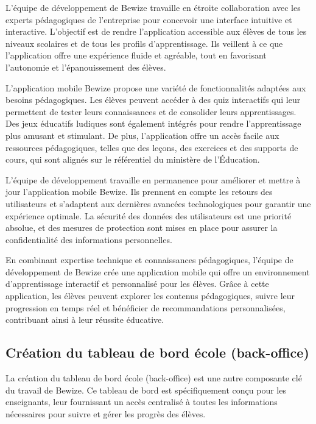     L'équipe de développement de Bewize travaille en étroite collaboration avec les experts pédagogiques de l'entreprise pour concevoir une interface intuitive et interactive. L'objectif est de rendre l'application accessible aux élèves de tous les niveaux scolaires et de tous les profils d'apprentissage. Ils veillent à ce que l'application offre une expérience fluide et agréable, tout en favorisant l'autonomie et l'épanouissement des élèves.
    
    L'application mobile Bewize propose une variété de fonctionnalités adaptées aux besoins pédagogiques. Les élèves peuvent accéder à des quiz interactifs qui leur permettent de tester leurs connaissances et de consolider leurs apprentissages. Des jeux éducatifs ludiques sont également intégrés pour rendre l'apprentissage plus amusant et stimulant. De plus, l'application offre un accès facile aux ressources pédagogiques, telles que des leçons, des exercices et des supports de cours, qui sont alignés sur le référentiel du ministère de l'Éducation.
    
    L'équipe de développement travaille en permanence pour améliorer et mettre à jour l'application mobile Bewize. Ils prennent en compte les retours des utilisateurs et s'adaptent aux dernières avancées technologiques pour garantir une expérience optimale. La sécurité des données des utilisateurs est une priorité absolue, et des mesures de protection sont mises en place pour assurer la confidentialité des informations personnelles.
    
    En combinant expertise technique et connaissances pédagogiques, l'équipe de développement de Bewize crée une application mobile qui offre un environnement d'apprentissage interactif et personnalisé pour les élèves. Grâce à cette application, les élèves peuvent explorer les contenus pédagogiques, suivre leur progression en temps réel et bénéficier de recommandations personnalisées, contribuant ainsi à leur réussite éducative.
    
\subsection{Création du tableau de bord école (back-office)} 
    
    La création du tableau de bord école (back-office) est une autre composante clé du travail de Bewize. Ce tableau de bord est spécifiquement conçu pour les enseignants, leur fournissant un accès centralisé à toutes les informations nécessaires pour suivre et gérer les progrès des élèves.

